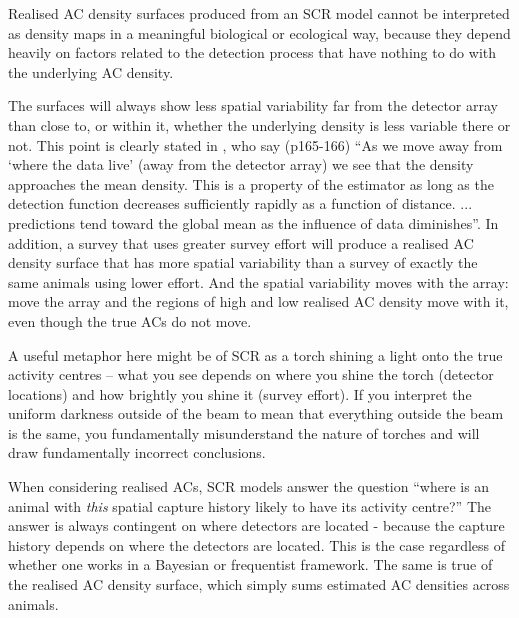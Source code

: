 \documentclass[useAMS,usenatbib,referee]{biom}
\begin{document}

Realised AC density surfaces produced from an SCR model cannot be interpreted as density maps in a meaningful biological or ecological way, because they depend heavily on factors related to the detection process that have nothing to do with the underlying AC density. 

The surfaces will always show less spatial variability far from the detector array than close to, or within it, whether the underlying density is less variable there or not. This point is clearly stated in \cite{Royle+al:13a}, who say (p165-166) ``As we move away from `where the data live' (away from the detector array) we see that the density approaches the mean density. This is a property of the estimator as long as the detection function decreases sufficiently rapidly as a function of distance. ... predictions tend toward the global mean as the influence of data diminishes''. In addition, a survey that uses greater survey effort will produce a realised AC density surface that has more spatial variability than a survey of exactly the same animals using lower effort. And the spatial variability moves with the array: move the array and the regions of high and low realised AC density move with it, even though the true ACs do not move.

A useful metaphor here might be of SCR as a torch shining a light onto the true activity centres -- what you see depends on where you shine the torch (detector locations) and how brightly you shine it (survey effort). If you interpret the uniform darkness outside of the beam to mean that everything outside the beam is the same, you fundamentally misunderstand the nature of torches and will draw fundamentally incorrect conclusions.


When considering realised ACs, SCR models answer the question ``where is an animal with {\it this} spatial capture history likely to have its activity centre?'' The answer is always contingent on where detectors are located - because the capture history depends on where the detectors are located. This is the case regardless of whether one works in a Bayesian or frequentist framework. The same is true of the realised AC density surface, which simply sums estimated AC densities across animals. 
\end{document}

